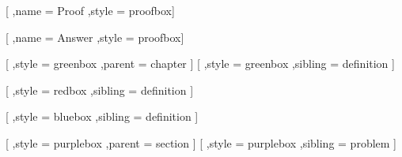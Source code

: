 [
    ,name = Proof
    ,style = proofbox]
\renewenvironment{proof}[1][\proofname]
{\vspace{-\vlengthBetweenColoredBoxes}\begin{proof*}}{\end{proof*}}

[
    ,name = Answer
    ,style = proofbox]
\newenvironment{answer}[1][\proofname]
{\vspace{-\vlengthBetweenColoredBoxes}\begin{answer*}}{\end{answer*}}

        [
            ,style = greenbox
            ,parent = chapter
        ]
        [
            ,style = greenbox
            ,sibling = definition
        ]

        [
            ,style = redbox
            ,sibling = definition
        ]

        [
            ,style = bluebox
            ,sibling = definition
        ]

        [
            ,style = purplebox
            ,parent = section
        ]
        [
            ,style = purplebox
            ,sibling = problem
        ]

